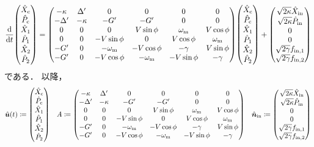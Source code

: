     \begin{align}
      \dv{t}\mqty(\hat{X}_{\r{c}} \\ \hat{P}_{\r{c}} \\ \hat{X}_{1} \\ \hat{P}_{1} \\ \hat{X}_{2} \\ \hat{P}_{2}) =
      \mqty(-\kappa & \Delta' & 0 & 0 & 0 & 0 \\
        -\Delta' & -\kappa & -G' & -G' & 0 & 0 \\
        0 & 0 & 0 & V \sin\phi & \omega_{\r{m}} & V \cos\phi \\
        0 & 0 & -V \sin\phi & 0 & V \cos\phi & \omega_{\r{m}} \\
        -G' & 0 & -\omega_{\r{m}} & -V \cos\phi & -\gamma & V \sin\phi \\
        -G' & 0 & -V \cos\phi & -\omega_{\r{m}} & -V \sin\phi & -\gamma)\mqty(\hat{X}_{\r{c}} \\ \hat{P}_{\r{c}} \\ \hat{X}_{1} \\ \hat{P}_{1} \\ \hat{X}_{2} \\ \hat{P}_{2})
        +\mqty(\sqrt{2\kappa}\hat{X}_{\r{in}} \\ \sqrt{2\kappa}\hat{P}_{\r{in}} \\ 0 \\ 0 \\ \sqrt{2\gamma}f_{\r{in, 1}} \\ \sqrt{2\gamma}f_{\r{in, 2}})
    \end{align}
    である．
    以降，
    \begin{align}
      \hat{\bm{u}}(t) \coloneqq\mqty(\hat{X}_{\r{c}} \\ \hat{P}_{\r{c}} \\ \hat{X}_{1} \\ \hat{P}_{1} \\ \hat{X}_{2} \\ \hat{P}_{2}) \quad A \coloneq \mqty(-\kappa & \Delta' & 0 & 0 & 0 & 0 \\
        -\Delta' & -\kappa & -G' & -G' & 0 & 0 \\
        0 & 0 & 0 & V \sin\phi & \omega_{\r{m}} & V \cos\phi \\
        0 & 0 & -V \sin\phi & 0 & V \cos\phi & \omega_{\r{m}} \\
        -G' & 0 & -\omega_{\r{m}} & -V \cos\phi & -\gamma & V \sin\phi \\
        -G' & 0 & -V \cos\phi & -\omega_{\r{m}} & -V \sin\phi & -\gamma) \quad
      \hat{\bm{n}}_{\r{in}} \coloneqq\mqty(\sqrt{2\kappa}\hat{X}_{\r{in}} \\ \sqrt{2\kappa}\hat{P}_{\r{in}} \\ 0 \\ 0 \\ \sqrt{2\gamma}f_{\r{in, 1}} \\ \sqrt{2\gamma}f_{\r{in, 2}})
    \end{align}
